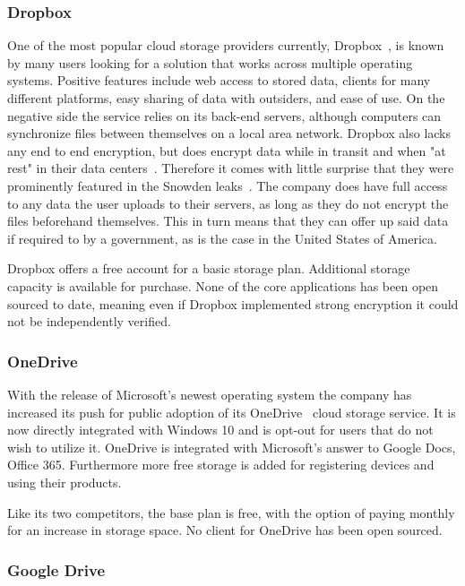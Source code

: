 \subsubsection{Dropbox}

One of the most popular cloud storage providers currently, Dropbox~\cite{web:site:dropbox}, is known by many users looking for a solution that works across multiple operating systems.
Positive features include web access to stored data, clients for many different platforms, easy sharing of data with outsiders, and ease of use.
On the negative side the service relies on its back-end servers, although computers can synchronize files between themselves on a local area network.
Dropbox also lacks any end to end encryption, but does encrypt data while in transit and when "at rest" in their data centers~\cite{web:site:dropbox:blog}.
Therefore it comes with little surprise that they were prominently featured in the Snowden leaks~\cite{web:site:rt:dropbox}.
The company does have full access to any data the user uploads to their servers, as long as they do not encrypt the files beforehand themselves.
This in turn means that they can offer up said data if required to by a government, as is the case in the United States of America.

Dropbox offers a free account for a basic storage plan.
Additional storage capacity is available for purchase.
None of the core applications has been open sourced to date, meaning even if Dropbox implemented strong encryption it could not be independently verified.

\subsubsection{OneDrive}

With the release of Microsoft's newest operating system the company has increased its push for public adoption of its OneDrive~\cite{web:site:onedrive} cloud storage service.
It is now directly integrated with Windows 10 and is opt-out for users that do not wish to utilize it.
OneDrive is integrated with Microsoft's answer to Google Docs, Office 365.
Furthermore more free storage is added for registering devices and using their products.

Like its two competitors, the base plan is free, with the option of paying monthly for an increase in storage space.
No client for OneDrive has been open sourced.

\subsubsection{Google Drive}

